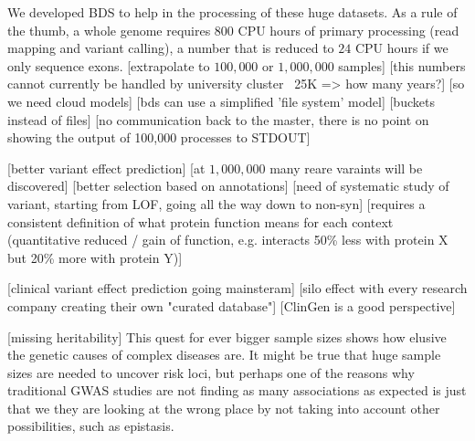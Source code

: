 We developed BDS to help in the processing of these huge datasets.
As a rule of the thumb, a whole genome requires $800$ CPU hours of primary processing (read mapping and variant calling), a number that is reduced to $24$ CPU hours if we only sequence exons.
[extrapolate to $100,000$ or $1,000,000$ samples]
[this numbers cannot currently be handled by university cluster ~25K => how many years?]
[so we need cloud models]
[bds can use a simplified 'file system' model]
[buckets instead of files]
[no communication back to the master, there is no point on showing the output of 100,000 processes to STDOUT]

[better variant effect prediction]
[at $1,000,000$ many reare varaints will be discovered]
[better selection based on annotations]
[need of systematic study of variant, starting from LOF, going all the way down to non-syn]
[requires a consistent definition of what protein function means for each context (quantitative reduced / gain of function, e.g. interacts 50\% less with protein X but 20\% more with protein Y)]

[clinical variant effect prediction going mainsteram]
[silo effect with every research company creating their own "curated database"]
[ClinGen is a good perspective]

[missing heritability]
This quest for ever bigger sample sizes shows how elusive the genetic causes of complex diseases are. 
It might be true that huge sample sizes are needed to uncover risk loci, but perhaps one of the reasons why traditional GWAS studies are not finding as many associations as expected is just that we they are looking at the wrong place by not taking into account other possibilities, such as epistasis.

